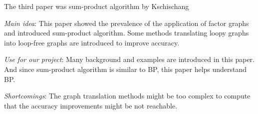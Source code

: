 The third paper was sum-product algorithm by Kschischang
\cite{Kschischang98factorgraphs}
\begin{itemize*}
\item {\em Main idea}:
This paper showed the prevalence of the application of factor graphs and introduced sum-product algorithm. Some methods translating loopy graphs into loop-free graphs are introduced to improve accuracy.

\item {\em Use for our project}:
Many background and examples are introduced in this paper. And since sum-product algorithm is similar to BP, this paper helps understand BP.

\item {\em Shortcomings}:
The graph translation methods might be too complex to compute that the accuracy improvements might be not reachable.

\end{itemize*}
